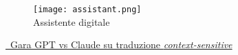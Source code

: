\begin{frame}[t]
{\begin{minipage}[b]{\textwidth}
\begin{minipage}[b]{.33\textwidth}
\begin{figure}[hb]
                \end{figure}
            \end{minipage}
            \begin{minipage}[b]{.33\textwidth}
                \begin{figure}[hb]
                    \centering
                    \texttt{[image: assistant.png]}\\Assistente digitale
                \end{figure}
            \end{minipage}
        \end{minipage}
		\begin{center}
			\href{https://www.google.com}{\faExternalLinkSquare\ Gara GPT vs Claude su traduzione \textit{context-sensitive}}
		\end{center}
    }
\end{frame}
%
